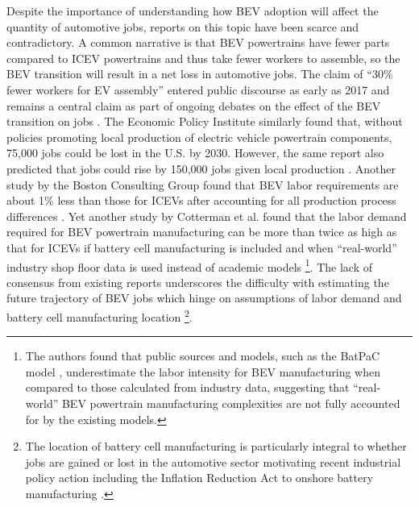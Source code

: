 \documentclass[sn-mathphys,Numbered]{sn-jnl}%
\begin{document}
Despite the importance of understanding how BEV adoption will affect the quantity of automotive jobs, reports on this topic have been scarce and contradictory. A common narrative is that BEV powertrains have fewer parts compared to ICEV powertrains and thus take fewer workers to assemble, so the BEV transition will result in a net loss in automotive jobs. The claim of ``30\% fewer workers for EV assembly'' entered public discourse as early as 2017 \cite{Ford_Motor_Company2017-ps} and remains a central claim as part of ongoing debates on the effect of the BEV transition on jobs \cite{Vellequette2019-qu, Levin2022-kt, Charette2023-jy, Fichera2023-lg}. The Economic Policy Institute similarly found that, without policies promoting local production of electric vehicle powertrain components, 75,000 jobs could be lost in the U.S. by 2030. However, the same report also predicted that jobs could rise by 150,000 jobs given local production \cite{Barrett2021-gf}. Another study by the Boston Consulting Group found that BEV labor requirements are about 1\% less than those for ICEVs after accounting for all production process differences \cite{Kupper2020-rh}. Yet another study by Cotterman et al. found that the labor demand required for BEV powertrain manufacturing can be more than twice as high as that for ICEVs if battery cell manufacturing is included and when ``real-world'' industry shop floor data is used instead of academic models \cite{Cotterman2022-jt}\footnote{The authors found that public sources and models, such as the BatPaC model \cite{Argonne_National_Lab2022-xx}, underestimate the labor intensity for BEV manufacturing when compared to those calculated from industry data, suggesting that ``real-world'' BEV powertrain manufacturing complexities are not fully accounted for by the existing models.}. The lack of consensus from existing reports underscores the difficulty with estimating the future trajectory of BEV jobs which hinge on assumptions of labor demand and battery cell manufacturing location \cite{Cotterman2022-jt, Kupper2020-rh, Barrett2021-gf}\footnote{The location of battery cell manufacturing is particularly integral to whether jobs are gained or lost in the automotive sector \cite{De_Ruyter2022-xn, Barrett2021-gf, The_White_House2022-jy} motivating recent industrial policy action including the Inflation Reduction Act to onshore battery manufacturing \cite{US_Department_of_the_Treasury2023-by}.}. 
\end{document}

